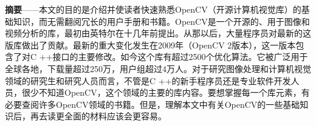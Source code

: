 \textbf{摘要}——本文的目的是介绍并使读者快速熟悉OpenCV（开源计算机视觉库）的基础知识，而无需翻阅冗长的用户手册和书籍。OpenCV是一个开源的、用于图像和视频分析的库，最初由英特尔在十几年前提出。从那以后，大量程序员对最新的这版库做出了贡献。最新的重大变化发生在2009年（OpenCV 2版本），这一版本包含了对C ++接口的主要修改。如今这个库有超过2500个优化算法。它被广泛用于全球各地，下载量超过250万，用户组超过4万人。对于研究图像处理和计算机视觉领域的研究生和研究人员而言，不管是C ++的新手程序员还是专业软件开发人员，很少不知道OpenCV，这个领域的主要的库内容。要想掌握每一个库元素，有必要查阅许多OpenCV领域的书籍。但是，理解本文中有关OpenCV的一些基础知识后，再去读更全面的材料应该会更容易。\par


